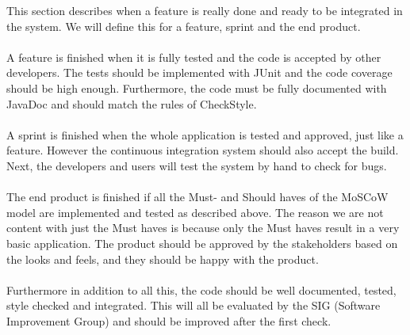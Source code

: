 This section describes when a feature is really done and ready to be integrated in the system. We will define this for a feature, sprint and the end product.
\\\\
A feature is finished when it is fully tested and the code is accepted by other developers.
The tests should be implemented with JUnit and the code coverage should be high enough.
Furthermore, the code must be fully documented with JavaDoc and should match the rules of CheckStyle.
\\\\
A sprint is finished when the whole application is tested and approved, just like a feature. However the continuous integration system should also accept the build. Next, the developers and users will test the system by hand to check for bugs.
\\\\
The end product is finished if all the Must- and Should haves of the MoSCoW model are implemented and tested as described above. The reason we are not content with just the Must haves is because only the Must haves result in a very basic application. The product should be approved by the stakeholders based on the looks and feels, and they should be happy with the product.
\\\\
Furthermore in addition to all this, the code should be well documented, tested, style checked and integrated. This will all be evaluated by the SIG (Software Improvement Group) and should be improved after the first check.